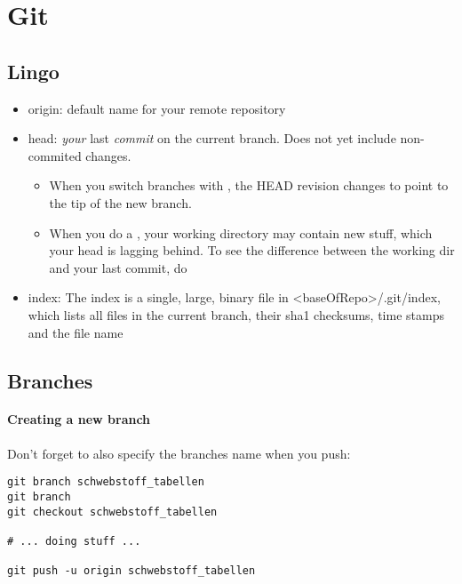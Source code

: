 \section{Git}

\subsection{Lingo}
\begin{itemize}

    \item origin: default name for your remote repository
    
    \item head: \emph{your} last \emph{commit} on the current branch. Does not yet include non-commited changes. 
        \begin{itemize}
            \item When you switch branches with , the HEAD revision changes to point to the tip of the new
            branch.
            \item When you do a , your working directory may contain new stuff, which your head is lagging behind. To see the difference between the working dir and your last commit, do 
        \end{itemize}
        
    \item index: The index is a single, large, binary file in <baseOfRepo>/.git/index, which lists all files in the current branch, their sha1 checksums, time stamps and the file name
    
\end{itemize}

\subsection{Branches}

\paragraph{Creating a new branch} Don't forget to also specify the branches name when you push:

\begin{lstlisting}
git branch schwebstoff_tabellen
git branch
git checkout schwebstoff_tabellen

# ... doing stuff ...

git push -u origin schwebstoff_tabellen
\end{lstlisting}

